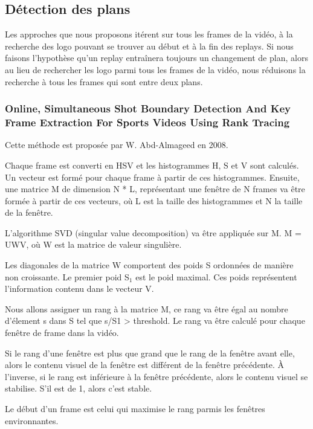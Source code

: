 \documentclass[11pt]{article}
\begin{document}
\subsection{Détection des plans}
\label{sec:orgbc5136b}
Les approches que nous proposons itérent sur tous les frames de la vidéo, à la recherche des logo pouvant se trouver au début et à la fin des replays.
Si nous faisons l'hypothèse qu'un replay entraînera toujours un changement de plan, alors au lieu de rechercher les logo parmi tous les frames de la vidéo, nous réduisons la recherche à tous les frames qui sont entre deux plans.

\subsubsection{Online, Simultaneous Shot Boundary Detection And Key Frame Extraction For Sports Videos Using Rank Tracing}
\label{sec:orgaa8ca87}
Cette méthode est proposée par W. Abd-Almageed en 2008.

Chaque frame est converti en HSV et les histogrammes H, S et V sont calculés.
Un vecteur est formé pour chaque frame à partir de ces histogrammes.
Ensuite, une matrice M de dimension N * L, représentant une fenêtre de N frames va être formée à partir de ces vecteurs, où L est la taille des histogrammes et N la taille de la fenêtre.

L'algorithme SVD (singular value decomposition) va être appliquée sur M. M = UWV, où W est la matrice de valeur singulière.

Les diagonales de la matrice W comportent des poids S ordonnées de manière non croissante.
Le premier poid S\(_{\text{1}}\) est le poid maximal. Ces poids représentent l'information contenu dans le vecteur V.

Nous allons assigner un rang à la matrice M,  ce rang va être égal au nombre d'élement s dans S tel que s/S1 > threshold. Le rang va être calculé pour chaque fenêtre de frame dans la vidéo.

Si le rang d'une fenêtre est plus que grand que le rang de la fenêtre avant elle, alors le contenu visuel de la fenêtre est différent de la fenêtre précédente.
À l'inverse, si le rang est inférieure à la fenêtre précédente, alors le contenu visuel se stabilise. S'il est de 1, alors c'est stable.

Le début d'un frame est celui qui maximise le rang parmis les fenêtres environnantes.
\end{document}
